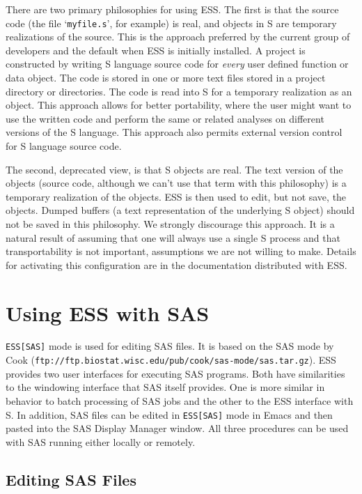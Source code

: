 \documentclass{article}
\newcommand{\stexttt}[1]{{\small\texttt{#1}}}
\newcommand{\ssf}[1]{{\small\sf{#1}}}
\newcommand{\file}[1]{`\stexttt{#1}'}
\begin{document}
There are two primary philosophies for using ESS.  The first is that the
source code (the file \file{myfile.s}, for example) is real, and objects
in S are temporary realizations of the source.  This is the approach
preferred by the current group of developers and the default when ESS is
initially installed.  A project is constructed by writing S language
source code for \emph{every} user defined function or data object.  The
code is stored in one or more text files stored in a project directory
or directories.  The code is read into S for a temporary realization as
an object.  This approach allows for better portability, where the user
might want to use the written code and perform the same or related
analyses on different versions of the S language.  This approach also
permits external version control for S language source code.

The second, deprecated view, is that S objects are real.  The text
version of the objects (source code, although we can't use that term
with this philosophy) is a temporary realization of the objects.  ESS
is then used to edit, but not save, the objects.
Dumped buffers (a text representation of the underlying S object)
should not be saved in this philosophy.
We strongly discourage this approach.  It is a natural result of
assuming that one will always use a single S process and that
transportability is not important, assumptions we are not willing to
make.  Details for activating this configuration are in the
documentation distributed with ESS.


\section{Using ESS with SAS}
\label{sec:SAS}

\stexttt{ESS[SAS]} mode is used for editing SAS files.  It is based on
the SAS mode by Cook
(\stexttt{ftp://ftp.biostat.wisc.edu/pub/cook/sas-mode/sas.tar.gz}).
ESS provides two user interfaces for executing SAS programs.  Both
have similarities to the windowing interface that SAS itself provides.
One is more similar in behavior to batch processing of SAS jobs and
the other to the ESS interface with S.  In addition, SAS files can be
edited in \stexttt{ESS[SAS]} mode in Emacs and then pasted into the
SAS Display Manager \ssf{Program Editor} window.  All three procedures
can be used with SAS running either locally or remotely.

\subsection{Editing SAS Files}
\label{sec:SAS:edit}
\end{document}
